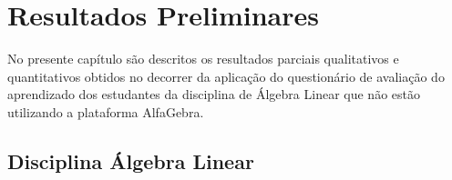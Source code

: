 \chapter{Resultados Preliminares}
\label{cap:resultados}
\noindent No presente capítulo são descritos os resultados parciais qualitativos e quantitativos obtidos no decorrer da aplicação do questionário de avaliação do aprendizado dos estudantes da disciplina de Álgebra Linear que não estão utilizando a plataforma AlfaGebra.

\section{Disciplina Álgebra Linear}
\label{disciplina_3_ultimos_semestre}

